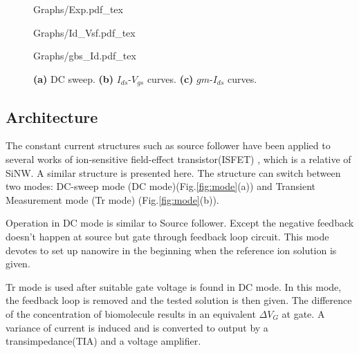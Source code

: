 \documentclass{article}
\begin{document}
\begin{figure}[!bht]
    \begin{minipage}[!htb]{0\linewidth}
        \centering
        \def\svgwidth{3cm}
        \fontsize{6}{15}\selectfont
         {Graphs/Exp.pdf_tex}
        \fontsize{8}{10}\selectfont
    \end{minipage}
    \hfill
    \begin{minipage}[!htb]{0.6\linewidth}
        \begin{minipage}[!htb]{0.97\linewidth}
            \centering
            \def\svgwidth{4.3cm}
            \fontsize{6}{15}\selectfont
             {Graphs/Id_Vsf.pdf_tex}
            \fontsize{8}{10}\selectfont
            \makebox[4.3cm]{ }
        \end{minipage}
        \vfill
        \begin{minipage}[!htb]{1\linewidth}
            \centering
            \def\svgwidth{3.8cm}
            \fontsize{6}{15}\selectfont
             {Graphs/gbs_Id.pdf_tex}
            \fontsize{8}{10}\selectfont
        \end{minipage}
    \end{minipage}
    \caption{\textbf{(a)} DC sweep. \textbf{(b)} $I_{ds}$-$V_{gs}$ curves. \textbf{(c)} $gm$-$I_{ds}$ curves.}
    \label{fig:idvg}
\end{figure}




\subsection{Architecture}
The constant current structures such as source follower have been applied to several works of ion-sensitive field-effect transistor(ISFET) \cite{J6}, which is a relative of SiNW.
A similar structure is presented here.
The structure can switch between two modes: DC-sweep mode (DC mode)(Fig.\ref{fig:mode}(a)) and Transient Measurement mode (Tr mode) (Fig.\ref{fig:mode}(b)).

Operation in DC mode is similar to Source follower.
Except the negative feedback doesn’t happen at source but gate through feedback loop circuit.
This mode devotes to set up nanowire in the beginning when the reference ion solution is given.

Tr mode is used after suitable gate voltage is found in DC mode.
In this mode, the feedback loop is removed and the tested solution is then given.
The difference of the concentration of biomolecule results in an equivalent $\Delta V_G$ at gate.
A variance of current is induced and is converted to output by a transimpedance(TIA) and a voltage amplifier.
\end{document}
